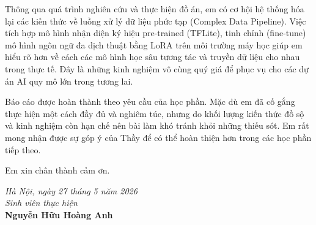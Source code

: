 ﻿\documentclass{article}
\numberwithin{equation}{section}
\numberwithin{figure}{section}
\numberwithin{table}{section}
\begin{document}
Thông qua quá trình nghiên cứu và thực hiện đồ án, em có cơ hội hệ thống hóa lại các kiến thức về luồng xử lý dữ liệu phức tạp (Complex Data Pipeline). Việc tích hợp mô hình nhận diện ký hiệu pre-trained (TFLite), tinh chỉnh (fine-tune) mô hình ngôn ngữ đa dịch thuật bằng LoRA trên môi trường máy học giúp em hiểu rõ hơn về cách các mô hình học sâu tương tác và truyền dữ liệu cho nhau trong thực tế. Đây là những kinh nghiệm vô cùng quý giá để phục vụ cho các dự án AI quy mô lớn trong tương lai.

Báo cáo được hoàn thành theo yêu cầu của học phần. Mặc dù em đã cố gắng thực hiện một cách đầy đủ và nghiêm túc, nhưng do khối lượng kiến thức đồ sộ và kinh nghiệm còn hạn chế nên bài làm khó tránh khỏi những thiếu sót. Em rất mong nhận được sự góp ý của Thầy để có thể hoàn thiện hơn trong các học phần tiếp theo.

Em xin chân thành cảm ơn.

\vspace{1cm}
\begin{flushright}
    \setlength{\rightskip}{1cm}
    \textit{Hà Nội, ngày 27 tháng 5 năm 2026}\\
    \vspace{0.5cm}
    \textit{Sinh viên thực hiện}\\
    \vspace{2cm}
    \textbf{Nguyễn Hữu Hoàng Anh}
\end{flushright}

\newpage

\setcounter{page}{1}






\end{document}
